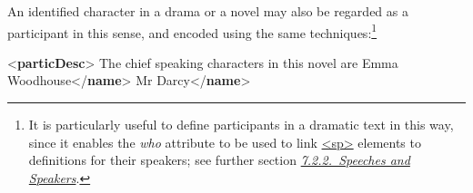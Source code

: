 An identified character in a drama or a novel may also be regarded as a participant in this sense, and encoded using the same techniques:\footnote{It is particularly useful to define participants in a dramatic text in this way, since it enables the {\itshape who} attribute to be used to link \hyperref[TEI.sp]{<sp>} elements to definitions for their speakers; see further section \textit{\hyperref[DRSP]{7.2.2.\ Speeches and Speakers}}.} \par\bgroup{}\exampleFont \begin{shaded}\noindent\mbox{}{<\textbf{particDesc}>}\mbox{}\newline 
{}The chief speaking characters in this novel are\mbox{}\newline 
{}\mbox{}\newline 
\hspace*{1em}\hspace*{1em}\mbox{}\newline 
\hspace*{1em}\hspace*{1em}\hspace*{1em}Emma Woodhouse{</\textbf{name}>}\mbox{}\newline 
\hspace*{1em}\hspace*{1em}\mbox{}\newline 
\hspace*{1em}\hspace*{1em}\mbox{}\newline 
\hspace*{1em}\hspace*{1em}\hspace*{1em}Mr Darcy{</\textbf{name}>}\mbox{}\newline 

\end{shaded}
